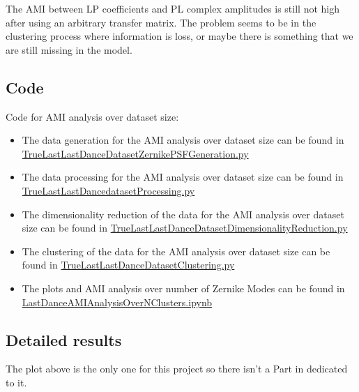 		The AMI between LP coefficients and PL complex amplitudes is still not high after using an arbitrary transfer matrix. The problem seems to be in the clustering process where information is loss, or maybe there is something that we are still missing in the model.\\
		
	
	\subsection{Code}
	
	Code for AMI analysis over dataset size:
	\begin{itemize}
		\item The data generation for the AMI analysis over dataset size can be found in \href{https://github.com/Dacarpe03/PLImageReconstruction/blob/main/PSFReconstruction/Scripts/TrueLastLastDanceDatasetZernikePSFGeneration.py}{TrueLastLastDanceDatasetZernikePSFGeneration.py}
		\item The data processing for the AMI analysis over dataset size can be found in \href{https://github.com/Dacarpe03/PLImageReconstruction/blob/main/PSFReconstruction/Scripts/TrueLastLastDancedatasetProcessing.py}{TrueLastLastDancedatasetProcessing.py}
		\item The dimensionality reduction of the data for the AMI analysis over dataset size can be found in \href{https://github.com/Dacarpe03/PLImageReconstruction/blob/main/PSFReconstruction/Scripts/TrueLastLastDanceDatasetDimensionalityReduction.py}{TrueLastLastDanceDatasetDimensionalityReduction.py}
		\item The clustering of the data for the AMI analysis over dataset size can be found in \href{https://github.com/Dacarpe03/PLImageReconstruction/blob/main/PSFReconstruction/Scripts/TrueLastLastDanceDatasetClustering.py}{TrueLastLastDanceDatasetClustering.py}
		\item The plots and AMI analysis over number of Zernike Modes can be found in \href{https://github.com/Dacarpe03/PLImageReconstruction/blob/main/PSFReconstruction/DataNotebooks/LastDanceAMIAnalysisOverNClusters.ipynb}{LastDanceAMIAnalysisOverNClusters.ipynb}
	\end{itemize}
	
	
	\subsection{Detailed results}
	
		The plot above is the only one for this project so there isn't a Part in  dedicated to it.
	